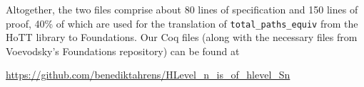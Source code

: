 \documentclass[11pt]{scrartcl}
\theoremstyle{plain}
\theoremstyle{definition}
\begin{document}
Altogether, the two files comprise about 80 lines of specification and 150 lines of proof, 40\% of which
are used for the translation of \lstinline!total_paths_equiv! from the \textsf{HoTT} library to
\textsf{Foundations}.
Our \textsf{Coq} files (along with the necessary files from Voevodsky's \textsf{Foundations} repository) can be found at
\begin{center}
 \url{https://github.com/benediktahrens/HLevel_n_is_of_hlevel_Sn}
\end{center}

% 
\printbibliography
\end{document}
